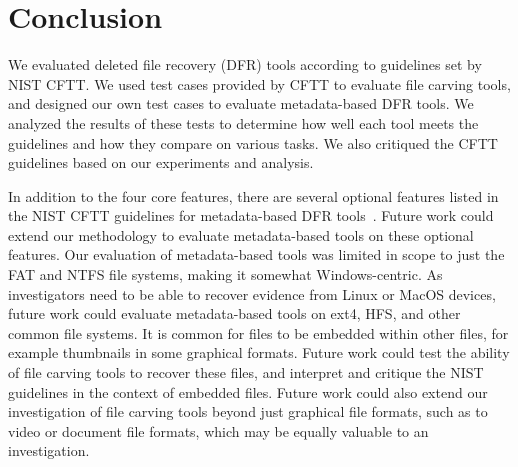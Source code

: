 \section{Conclusion}\label{conclusion} 

We evaluated deleted file recovery (DFR) tools according to guidelines set by NIST CFTT.
We used test cases provided by CFTT to evaluate file carving tools, and designed our own test cases to evaluate metadata-based DFR tools.
We analyzed the results of these tests to determine how well each tool meets the guidelines and how they compare on various tasks.
We also critiqued the CFTT guidelines based on our experiments and analysis.

In addition to the four core features, there are several optional features listed in the NIST CFTT guidelines for metadata-based DFR tools~\cite{meta:dfr:standards}.
Future work could extend our methodology to evaluate metadata-based tools on these optional features.
Our evaluation of metadata-based tools was limited in scope to just the FAT and NTFS file systems, making it somewhat Windows-centric.
As investigators need to be able to recover evidence from Linux or MacOS devices, future work could evaluate metadata-based tools on ext4, HFS, and other common file systems.
It is common for files to be embedded within other files, for example thumbnails in some graphical formats.
Future work could test the ability of file carving tools to recover these files, and interpret and critique the NIST guidelines in the context of embedded files.
Future work could also extend our investigation of file carving tools beyond just graphical file formats, such as to video or document file formats, which may be equally valuable to an investigation.

